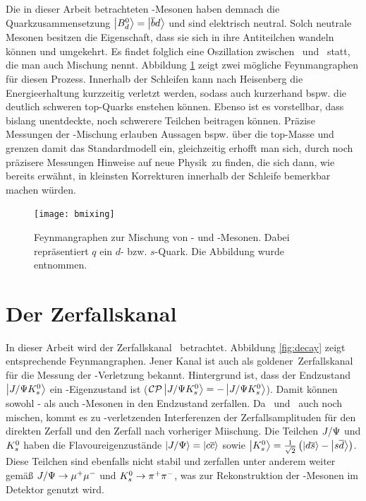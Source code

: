 Die in dieser Arbeit betrachteten \Bd-Mesonen haben demnach die Quarkzusammensetzung $\Ket{\text{$B_d^0$}} = \Ket{\overline{b}d}$ und sind elektrisch neutral. Solch neutrale Mesonen besitzen die Eigenschaft, dass sie sich in ihre Antiteilchen wandeln können und umgekehrt. Es findet folglich eine Oszillation zwischen \Bd\ und \Bdbar\ statt, die man auch Mischung nennt. Abbildung \ref{fig:bmixing} zeigt zwei mögliche Feynmangraphen für diesen Prozess. Innerhalb der Schleifen kann nach Heisenberg die Energieerhaltung kurzzeitig verletzt werden, sodass auch kurzerhand bspw. die deutlich schweren top-Quarks enstehen können. Ebenso ist es vorstellbar, dass bislang unentdeckte, noch schwerere Teilchen beitragen können. Präzise Messungen der \Bd-Mischung erlauben Aussagen bspw. über die top-Masse und grenzen damit das Standardmodell ein, gleichzeitig erhofft man sich, durch noch präzisere Messungen Hinweise auf \glqq neue Physik\grqq\ zu finden, die sich dann, wie bereits erwähnt, in kleinsten Korrekturen innerhalb der Schleife bemerkbar machen würden.

\begin{figure}[hptb]
\centering
\texttt{[image: bmixing]}
\caption{Feynmangraphen zur Mischung von \Bd- und \Bdbar-Mesonen. Dabei repräsentiert $q$ ein $d$- bzw. $s$-Quark. Die Abbildung wurde \cite{roadmap} entnommen.}
\label{fig:bmixing}
\end{figure}


\section{Der Zerfallskanal \Decaychannel}
In dieser Arbeit wird der Zerfallskanal \Decaychannel\ betrachtet. Abbildung \ref{fig:decay} zeigt entsprechende Feynmangraphen. Jener Kanal ist auch als \glqq goldener\grqq\ Zerfallskanal für die Messung der \CP-Verletzung bekannt. Hintergrund ist, dass der Endzustand $\Ket{J/\Psi K_s^0}$ ein \CP-Eigenzustand ist ($\text{$\mathcal{CP}$}\Ket{J/\Psi K_s^0} = - \Ket{J/\Psi K_s^0}$). Damit können sowohl \Bd- als auch \Bdbar-Mesonen in den Endzustand zerfallen. Da \Bd\ und \Bdbar\ auch noch mischen, kommt es zu \CP-verletzenden Interferenzen der Zerfallsamplituden für den direkten Zerfall und den Zerfall nach vorheriger Miischung. Die Teilchen $J/\Psi$ und $K_s^0$ haben die Flavoureigenzustände $\Ket{J/\Psi} = \Ket{c\overline{c}}$ sowie $\Ket{K_s^0} = \tfrac{1}{\sqrt{2}}\left(\Ket{d\overline{s}}-\Ket{s\overline{d}}\right)$. Diese Teilchen sind ebenfalls nicht stabil und zerfallen unter anderem weiter gemäß $J/\Psi \rightarrow \mu^+\mu^-$ und $K_s^0 \rightarrow \pi^+\pi^-$, was zur Rekonstruktion der \Bd-Mesonen im Detektor genutzt wird.

